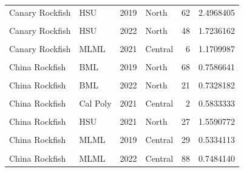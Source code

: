 \documentclass[
]{article}
\begin{document}
\begin{longtable}[t]{llrlrr}
Canary Rockfish & HSU & 2019 & North & 62 & 2.4968405\\
\cellcolor{gray!6}{Canary Rockfish} & \cellcolor{gray!6}{HSU} & \cellcolor{gray!6}{2021} & \cellcolor{gray!6}{North} & \cellcolor{gray!6}{57} & \cellcolor{gray!6}{2.3458428}\\
\addlinespace
Canary Rockfish & HSU & 2022 & North & 48 & 1.7236162\\
\cellcolor{gray!6}{Canary Rockfish} & \cellcolor{gray!6}{MLML} & \cellcolor{gray!6}{2019} & \cellcolor{gray!6}{Central} & \cellcolor{gray!6}{7} & \cellcolor{gray!6}{0.4694076}\\
Canary Rockfish & MLML & 2021 & Central & 6 & 1.1709987\\
\cellcolor{gray!6}{Canary Rockfish} & \cellcolor{gray!6}{MLML} & \cellcolor{gray!6}{2022} & \cellcolor{gray!6}{Central} & \cellcolor{gray!6}{11} & \cellcolor{gray!6}{0.7282766}\\
China Rockfish & BML & 2019 & North & 68 & 0.7586641\\
\addlinespace
\cellcolor{gray!6}{China Rockfish} & \cellcolor{gray!6}{BML} & \cellcolor{gray!6}{2021} & \cellcolor{gray!6}{North} & \cellcolor{gray!6}{60} & \cellcolor{gray!6}{1.2575488}\\
China Rockfish & BML & 2022 & North & 21 & 0.7328182\\
\cellcolor{gray!6}{China Rockfish} & \cellcolor{gray!6}{Cal Poly} & \cellcolor{gray!6}{2019} & \cellcolor{gray!6}{Central} & \cellcolor{gray!6}{3} & \cellcolor{gray!6}{0.5337796}\\
China Rockfish & Cal Poly & 2021 & Central & 2 & 0.5833333\\
\cellcolor{gray!6}{China Rockfish} & \cellcolor{gray!6}{HSU} & \cellcolor{gray!6}{2019} & \cellcolor{gray!6}{North} & \cellcolor{gray!6}{19} & \cellcolor{gray!6}{1.6524887}\\
\addlinespace
China Rockfish & HSU & 2021 & North & 27 & 1.5590772\\
\cellcolor{gray!6}{China Rockfish} & \cellcolor{gray!6}{HSU} & \cellcolor{gray!6}{2022} & \cellcolor{gray!6}{North} & \cellcolor{gray!6}{23} & \cellcolor{gray!6}{1.1298447}\\
China Rockfish & MLML & 2019 & Central & 29 & 0.5334113\\
\cellcolor{gray!6}{China Rockfish} & \cellcolor{gray!6}{MLML} & \cellcolor{gray!6}{2021} & \cellcolor{gray!6}{Central} & \cellcolor{gray!6}{60} & \cellcolor{gray!6}{0.9763152}\\
China Rockfish & MLML & 2022 & Central & 88 & 0.7484140\\

\end{longtable}
\end{document}

